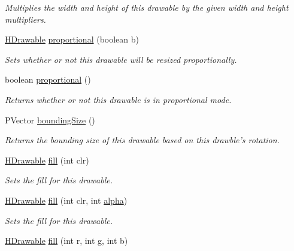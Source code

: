 \begin{DoxyCompactItemize}
\begin{DoxyCompactList}\small\item\em Multiplies the width and height of this drawable by the given width and height multipliers. \end{DoxyCompactList}\item 
\hyperlink{classhype_1_1core_1_1drawable_1_1_h_drawable}{H\-Drawable} \hyperlink{classhype_1_1core_1_1drawable_1_1_h_drawable_ae4497942c7fbf1112bb8e557ec72aad8}{proportional} (boolean b)
\begin{DoxyCompactList}\small\item\em Sets whether or not this drawable will be resized proportionally. \end{DoxyCompactList}\item 
boolean \hyperlink{classhype_1_1core_1_1drawable_1_1_h_drawable_a220999f7d54e04a47ad0509d349a2bdd}{proportional} ()
\begin{DoxyCompactList}\small\item\em Returns whether or not this drawable is in proportional mode. \end{DoxyCompactList}\item 
P\-Vector \hyperlink{classhype_1_1core_1_1drawable_1_1_h_drawable_a0441f8e79c68e194dac8a67002d58442}{bounding\-Size} ()
\begin{DoxyCompactList}\small\item\em Returns the bounding size of this drawable based on this drawble's rotation. \end{DoxyCompactList}\item 
\hyperlink{classhype_1_1core_1_1drawable_1_1_h_drawable}{H\-Drawable} \hyperlink{classhype_1_1core_1_1drawable_1_1_h_drawable_aeaea8f98b9ff946de11810a6bf43b052}{fill} (int clr)
\begin{DoxyCompactList}\small\item\em Sets the fill for this drawable. \end{DoxyCompactList}\item 
\hyperlink{classhype_1_1core_1_1drawable_1_1_h_drawable}{H\-Drawable} \hyperlink{classhype_1_1core_1_1drawable_1_1_h_drawable_a6ab630962896a064bb7001972c1b9c03}{fill} (int clr, int \hyperlink{classhype_1_1core_1_1drawable_1_1_h_drawable_ae0711e3bde7279c84b0282f928bbe699}{alpha})
\begin{DoxyCompactList}\small\item\em Sets the fill for this drawable. \end{DoxyCompactList}\item 
\hyperlink{classhype_1_1core_1_1drawable_1_1_h_drawable}{H\-Drawable} \hyperlink{classhype_1_1core_1_1drawable_1_1_h_drawable_a869e813cfe373cd52b3eb79a27a0f6b7}{fill} (int r, int g, int b)

\end{DoxyCompactItemize}
